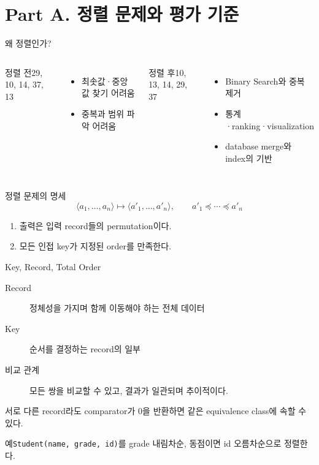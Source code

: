 \section{Part A. 정렬 문제와 평가 기준}
\begin{frame}{왜 정렬인가?}
\begin{columns}[T]\begin{block}{정렬 전}\large 29, 10, 14, 37, 13\end{block}\begin{itemize}\item 최솟값·중앙값 찾기 어려움\item 중복과 범위 파악 어려움\end{itemize}\begin{block}{정렬 후}\large 10, 13, 14, 29, 37\end{block}\begin{itemize}\item Binary Search와 중복 제거\item 통계·ranking·visualization\item database merge와 index의 기반\end{itemize}\end{columns}
\end{frame}
\begin{frame}{정렬 문제의 명세}
\[\langle a_1,\dots,a_n\rangle\longmapsto\langle a'_1,\dots,a'_n\rangle,\qquad a'_1\preceq\cdots\preceq a'_n\]
\begin{enumerate}\item 출력은 입력 record들의 \alert{permutation}이다.\item 모든 인접 key가 지정된 order를 만족한다.\end{enumerate}
\vfill{}
\end{frame}
\begin{frame}{Key, Record, Total Order}
\begin{description}\item[Record] 정체성을 가지며 함께 이동해야 하는 전체 데이터\item[Key] 순서를 결정하는 record의 일부\item[비교 관계] 모든 쌍을 비교할 수 있고, 결과가 일관되며 추이적이다.\end{description}
서로 다른 record라도 comparator가 0을 반환하면 같은 equivalence class에 속할 수 있다.
\begin{exampleblock}{예}\texttt{Student(name, grade, id)}를 grade 내림차순, 동점이면 id 오름차순으로 정렬한다.\end{exampleblock}
\end{frame}
